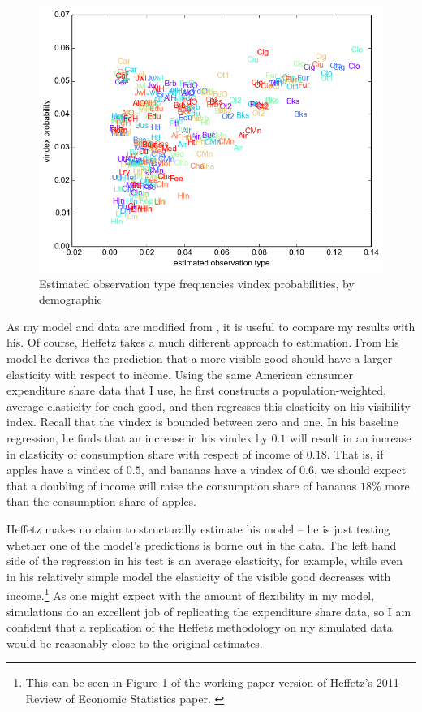 \documentclass[11pt]{article}
\begin{document}
\begin{CJK}{UTF8}{gbsn}
\begin{figure}
    \centering
	\includegraphics[scale=.8]{pics/obs_vin_scat.png}
    \caption{Estimated observation type frequencies vindex probabilities, by demographic}
    \label{fig:vinmatch}
\end{figure}

As my model and data are modified from \citet{heffetz2011}, it is useful to compare my results with his.  Of course, Heffetz takes a much different approach to estimation.  From his model he derives the prediction that a more visible good should have a larger elasticity with respect to income.  Using the same American consumer expenditure share data that I use, he first constructs a population-weighted, average elasticity for each good, and then regresses this elasticity on his visibility index.  Recall that the vindex is bounded between zero and one.  In his baseline regression, he finds that an increase in his vindex by $0.1$ will result in an increase in elasticity of consumption share with respect of income of $0.18$.  That is, if apples have a vindex of $0.5$, and bananas have a vindex of $0.6$, we should expect that a doubling of income will raise the consumption share of bananas $18\%$ more than the consumption share of apples.

Heffetz makes no claim to structurally estimate his model -- he is just testing whether one of the model's predictions is borne out in the data.  The left hand side of the regression in his test is an average elasticity, for example, while even in his relatively simple model the elasticity of the visible good decreases with income.\footnote{This can be seen in Figure 1 of the working paper version of Heffetz's 2011 Review of Economic Statistics paper. \citep{heffetz2004conspicuous}}  As one might expect with the amount of flexibility in my model, simulations do an excellent job of replicating the expenditure share data, so I am confident that a replication of the Heffetz methodology on my simulated data would be reasonably close to the original estimates.


\end{CJK}
\end{document}
